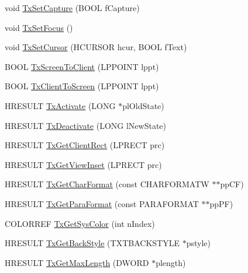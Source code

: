 \begin{DoxyCompactItemize}
\item 
void \hyperlink{class_c_formatted_text_draw_a44ef4a7a47a5be7d277d4b04e7e12a27}{Tx\-Set\-Capture} (B\-O\-O\-L f\-Capture)
\item 
void \hyperlink{class_c_formatted_text_draw_ae1f80562f0bb57e63f88ca07184a7290}{Tx\-Set\-Focus} ()
\item 
void \hyperlink{class_c_formatted_text_draw_ab1f8c8017864381e356371f36d7e6863}{Tx\-Set\-Cursor} (H\-C\-U\-R\-S\-O\-R hcur, B\-O\-O\-L f\-Text)
\item 
B\-O\-O\-L \hyperlink{class_c_formatted_text_draw_a5bbd1e639e6c48c33a6bfaa0d469e439}{Tx\-Screen\-To\-Client} (L\-P\-P\-O\-I\-N\-T lppt)
\item 
B\-O\-O\-L \hyperlink{class_c_formatted_text_draw_abb05d3c20125bb481a5256272d87b67f}{Tx\-Client\-To\-Screen} (L\-P\-P\-O\-I\-N\-T lppt)
\item 
H\-R\-E\-S\-U\-L\-T \hyperlink{class_c_formatted_text_draw_a94abf3aa085118853e6fb343dc56dbd1}{Tx\-Activate} (L\-O\-N\-G $\ast$pl\-Old\-State)
\item 
H\-R\-E\-S\-U\-L\-T \hyperlink{class_c_formatted_text_draw_a4f578fb1c8066bffccbe08661a58b3a9}{Tx\-Deactivate} (L\-O\-N\-G l\-New\-State)
\item 
H\-R\-E\-S\-U\-L\-T \hyperlink{class_c_formatted_text_draw_a7d26debc0162611ce308b7472e816a0e}{Tx\-Get\-Client\-Rect} (L\-P\-R\-E\-C\-T prc)
\item 
H\-R\-E\-S\-U\-L\-T \hyperlink{class_c_formatted_text_draw_a356e5054a4a70bfddebfa5456a51c0f2}{Tx\-Get\-View\-Inset} (L\-P\-R\-E\-C\-T prc)
\item 
H\-R\-E\-S\-U\-L\-T \hyperlink{class_c_formatted_text_draw_a1b6bf84a20ce406266dcd59e05579faa}{Tx\-Get\-Char\-Format} (const C\-H\-A\-R\-F\-O\-R\-M\-A\-T\-W $\ast$$\ast$pp\-C\-F)
\item 
H\-R\-E\-S\-U\-L\-T \hyperlink{class_c_formatted_text_draw_a9fcc615f0abc3edd55a5bc6eb07245c0}{Tx\-Get\-Para\-Format} (const P\-A\-R\-A\-F\-O\-R\-M\-A\-T $\ast$$\ast$pp\-P\-F)
\item 
C\-O\-L\-O\-R\-R\-E\-F \hyperlink{class_c_formatted_text_draw_a87bf95137cb9c82cf3b5b184d7b499cd}{Tx\-Get\-Sys\-Color} (int n\-Index)
\item 
H\-R\-E\-S\-U\-L\-T \hyperlink{class_c_formatted_text_draw_aae9e30620f85cd0855da77eefab5c542}{Tx\-Get\-Back\-Style} (T\-X\-T\-B\-A\-C\-K\-S\-T\-Y\-L\-E $\ast$pstyle)
\item 
H\-R\-E\-S\-U\-L\-T \hyperlink{class_c_formatted_text_draw_ac16e3287c2da3f1d4af57d268339b3b0}{Tx\-Get\-Max\-Length} (D\-W\-O\-R\-D $\ast$plength)

\end{DoxyCompactItemize}
